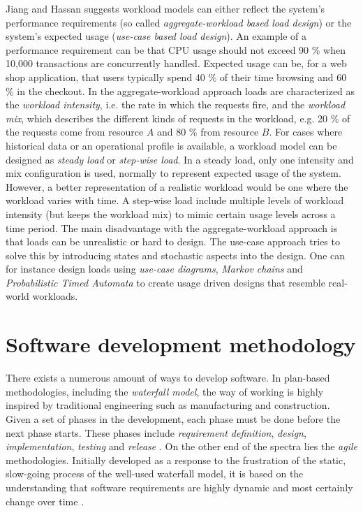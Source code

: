 Jiang and Hassan suggests workload models can either reflect the system's
performance requirements (so called \textit{aggregate-workload based load
design}) or the system's expected usage (\textit{use-case based load design}).
An example of a performance requirement can be that CPU usage should not exceed
90 \% when 10,000 transactions are concurrently handled. Expected usage can be,
for a web shop application, that users typically spend 40 \% of their time
browsing and 60 \% in the checkout. In the aggregate-workload approach loads
are characterized as the \textit{workload intensity}, i.e. the rate in which
the requests fire, and the \textit{workload mix}, which describes the different
kinds of requests in the workload, e.g. 20 \% of the requests come from
resource $A$ and 80 \% from resource $B$. For cases where historical data or an
operational profile is available, a workload model can be designed as
\textit{steady load} or \textit{step-wise load}. In a steady load, only one
intensity and mix configuration is used, normally to represent expected usage
of the system. However, a better representation of a realistic workload would
be one where the workload varies with time. A step-wise load include multiple
levels of workload intensity (but keeps the workload mix) to mimic certain
usage levels across a time period. The main disadvantage with the
aggregate-workload approach is that loads can be unrealistic or hard to design.
The use-case approach tries to solve this by introducing states and stochastic
aspects into the design. One can for instance design loads using \textit{use-case
diagrams}, \textit{Markov chains} and \textit{Probabilistic Timed Automata} to
create usage driven designs that resemble real-world workloads. \cite{jiang2015survey}

\section{Software development methodology}

There exists a numerous amount of ways to develop software. In plan-based
methodologies, including the \textit{waterfall model}, the way of working is
highly inspired by traditional engineering such as manufacturing and
construction. Given a set of phases in the development, each phase must be done
before the next phase starts. These phases include \textit{requirement
definition}, \textit{design}, \textit{implementation}, \textit{testing} and
\textit{release} \cite{crookshanks2014practical}. On the other end of the
spectra lies the \textit{agile} methodologies. Initially developed as a
response to the frustration of the static, slow-going process of the well-used
waterfall model, it is based on the understanding that software requirements
are highly dynamic and most certainly change over time
\cite{moniruzzaman2013comparative}.

